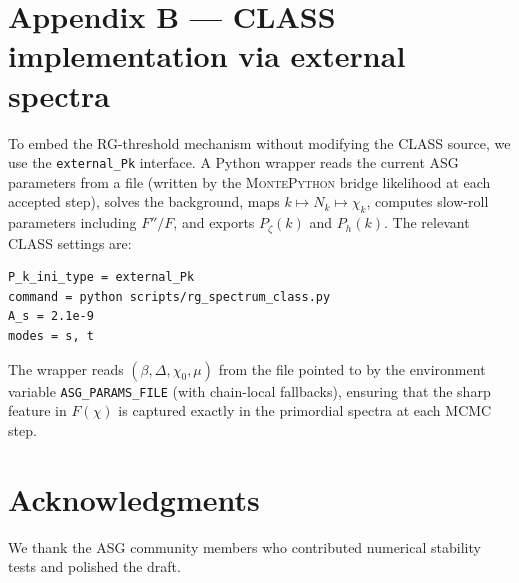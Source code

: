 \documentclass[11pt,a4paper]{article}
\begin{document}
\section{Appendix B --- CLASS implementation via external spectra}
To embed the RG-threshold mechanism without modifying the \textsc{CLASS} source, we use the \texttt{external\_Pk} interface. A Python wrapper reads the current ASG parameters from a file (written by the \textsc{MontePython} bridge likelihood at each accepted step), solves the background, maps $k\mapsto N_{k}\mapsto \chi_{k}$, computes slow-roll parameters including $F''/F$, and exports $P_{\zeta}(k)$ and $P_{h}(k)$. The relevant \textsc{CLASS} settings are:
\begin{verbatim}
P_k_ini_type = external_Pk
command = python scripts/rg_spectrum_class.py
A_s = 2.1e-9
modes = s, t
\end{verbatim}
The wrapper reads $(\beta,\Delta,\chi_0,\mu)$ from the file pointed to by the environment variable \texttt{ASG\_PARAMS\_FILE} (with chain-local fallbacks), ensuring that the sharp feature in $F(\chi)$ is captured exactly in the primordial spectra at each MCMC step.

\section*{Acknowledgments}
We thank the ASG community members who contributed numerical stability tests and polished the draft.
\end{document}
